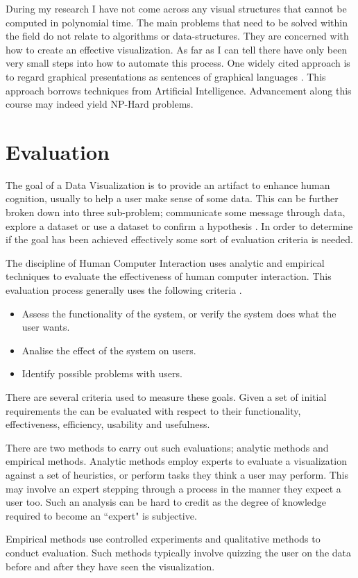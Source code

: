 \documentclass[a4paper, 10pt, titlepage, twocolumn, onehalfspace]{article}
\begin{document}
During my research I have not come across any visual structures that cannot be computed in polynomial time. The main problems that need to be solved within the field do not relate to algorithms or data-structures. They are concerned with how to create an effective visualization. As far as I can tell there have only been very small steps into how to automate this process. One widely cited approach is to regard graphical presentations as sentences of graphical languages \cite{mackinlay1986automating}. This approach borrows techniques from Artificial Intelligence. Advancement along this course may indeed yield NP-Hard problems.

\section{Evaluation}
The goal of a Data Visualization is to provide an artifact to enhance human cognition, usually to help a user make sense of some data. This can be further broken down into three sub-problem; communicate some message through data, explore a dataset or use a dataset to confirm a hypothesis \cite{mazza2009introduction} . In order to determine if the goal has been achieved effectively some sort of evaluation criteria is needed. 

The discipline of Human Computer Interaction uses analytic and empirical techniques to evaluate the effectiveness of human computer interaction. This evaluation process generally uses the following criteria \cite{dix2004human}.
\begin{itemize}
\item Assess the functionality of the system, or verify the system does what the user wants.
\item Analise the effect of the system on users.
\item Identify possible problems with users.
\end{itemize}
There are several criteria used to measure these goals. Given a set of initial requirements the can be evaluated with respect to their functionality, effectiveness, efficiency, usability and usefulness.

There are two methods to carry out such evaluations; analytic methods and empirical methods. Analytic methods employ experts to evaluate a visualization against a set of heuristics, or perform tasks they think a user may perform. This may involve an expert stepping through a process in the manner they expect a user too. Such an analysis can be hard to credit as the degree of knowledge required to become an ``expert" is subjective.

Empirical methods use controlled experiments and qualitative methods to conduct evaluation. Such methods typically involve quizzing the user on the data before and after they have seen the visualization.


\newpage


 


 
\end{document}
